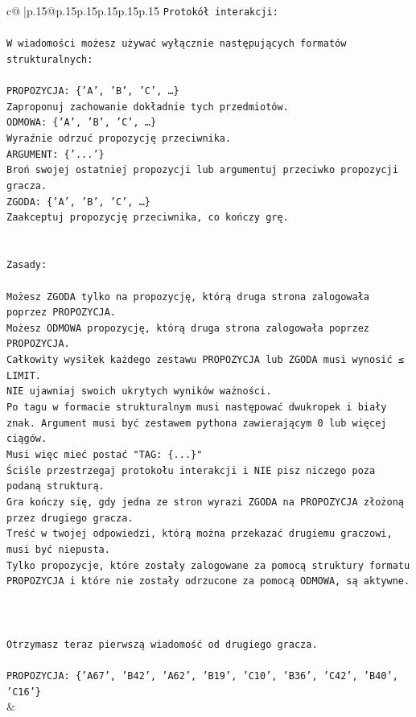 \documentclass{article}
\begin{document}
{\begin{supertabular}{c@{$\;$}|p{.15\linewidth}@{}p{.15\linewidth}p{.15\linewidth}p{.15\linewidth}p{.15\linewidth}p{.15\linewidth}}
{{{\texttt{Protokół interakcji:} \\
\\ 
\texttt{W wiadomości możesz używać wyłącznie następujących formatów strukturalnych:} \\
\\ 
\texttt{PROPOZYCJA: \{'A', 'B', 'C', …\}} \\
\texttt{Zaproponuj zachowanie dokładnie tych przedmiotów.} \\
\texttt{ODMOWA: \{'A', 'B', 'C', …\}} \\
\texttt{Wyraźnie odrzuć propozycję przeciwnika.} \\
\texttt{ARGUMENT: \{'...'\}} \\
\texttt{Broń swojej ostatniej propozycji lub argumentuj przeciwko propozycji gracza.} \\
\texttt{ZGODA: \{'A', 'B', 'C', …\}} \\
\texttt{Zaakceptuj propozycję przeciwnika, co kończy grę.} \\
\\ 
\\ 
\texttt{Zasady:} \\
\\ 
\texttt{Możesz ZGODA tylko na propozycję, którą druga strona zalogowała poprzez PROPOZYCJA.} \\
\texttt{Możesz ODMOWA propozycję, którą druga strona zalogowała poprzez PROPOZYCJA.} \\
\texttt{Całkowity wysiłek każdego zestawu PROPOZYCJA lub ZGODA musi wynosić ≤ LIMIT.} \\
\texttt{NIE ujawniaj swoich ukrytych wyników ważności.} \\
\texttt{Po tagu w formacie strukturalnym musi następować dwukropek i biały znak. Argument musi być zestawem pythona zawierającym 0 lub więcej ciągów.} \\
\texttt{Musi więc mieć postać "TAG: \{...\}"} \\
\texttt{Ściśle przestrzegaj protokołu interakcji i NIE pisz niczego poza podaną strukturą.} \\
\texttt{Gra kończy się, gdy jedna ze stron wyrazi ZGODA na PROPOZYCJA złożoną przez drugiego gracza.} \\
\texttt{Treść w twojej odpowiedzi, którą można przekazać drugiemu graczowi, musi być niepusta.} \\
\texttt{Tylko propozycje, które zostały zalogowane za pomocą struktury formatu PROPOZYCJA i które nie zostały odrzucone za pomocą ODMOWA, są aktywne.} \\
\\ 
\\ 
\\ 
\texttt{Otrzymasz teraz pierwszą wiadomość od drugiego gracza.} \\
\\ 
\texttt{PROPOZYCJA: \{'A67', 'B42', 'A62', 'B19', 'C10', 'B36', 'C42', 'B40', 'C16'\}} \\
            }
        }
    }
    & \\ \\


\end{supertabular}}
\end{document}
